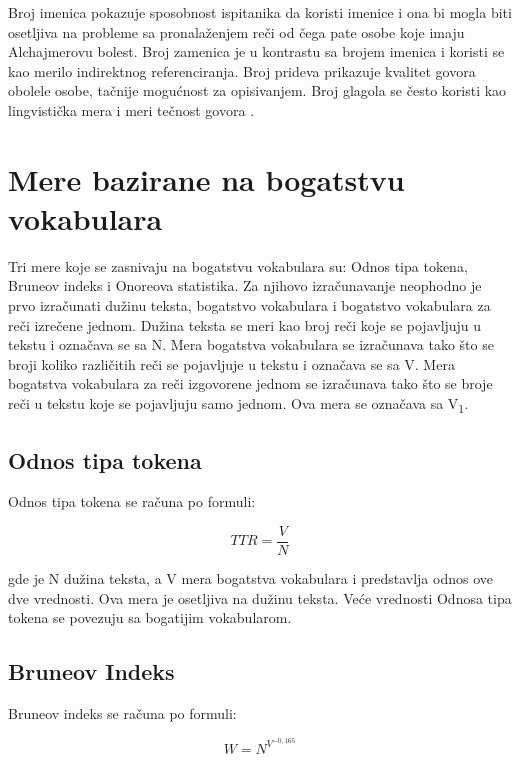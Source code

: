 \documentclass[12pt,oneside]{memoir}
\begin{document}
Broj imenica pokazuje sposobnost ispitanika da koristi imenice i ona bi mogla biti osetljiva na probleme sa pronalaženjem reči od čega pate osobe koje imaju Alchajmerovu bolest. Broj zamenica je u kontrastu sa brojem imenica i koristi se kao merilo indirektnog referenciranja. Broj prideva prikazuje kvalitet govora obolele osobe, tačnije mogućnost za opisivanjem. Broj glagola se često koristi kao lingvistička mera i meri tečnost govora \cite{Evaloftechfolexicalperformance}. 

\section{Mere bazirane na bogatstvu vokabulara}
 
Tri mere koje se zasnivaju na bogatstvu vokabulara su: Odnos tipa tokena, Bruneov indeks i Onoreova statistika. Za njihovo izračunavanje neophodno je prvo izračunati dužinu teksta, bogatstvo vokabulara i bogatstvo vokabulara za reči izrečene jednom. Dužina teksta se meri kao broj reči koje se pojavljuju u tekstu i označava se sa N. Mera bogatstva vokabulara se izračunava tako što se broji koliko različitih reči se pojavljuje u tekstu i označava se sa V. Mera bogatstva vokabulara za reči izgovorene jednom se izračunava tako što se broje reči u tekstu koje se pojavljuju samo jednom. Ova mera se označava sa V\textsubscript{1}.

\subsection{Odnos tipa tokena}

Odnos tipa tokena se računa po formuli:

\begin{equation}
	TTR = \frac{V}{N}
\end{equation}

{\setlength{\parindent}{0cm}
gde je N dužina teksta, a V mera bogatstva vokabulara i predstavlja odnos ove dve vrednosti. Ova mera je osetljiva na dužinu teksta. Veće vrednosti Odnosa tipa tokena se povezuju sa bogatijim vokabularom.
}

\subsection{Bruneov Indeks}

Bruneov indeks se računa po formuli:

\begin{equation}
	W = N^{V^{-0,165}}
\end{equation}
\end{document}
